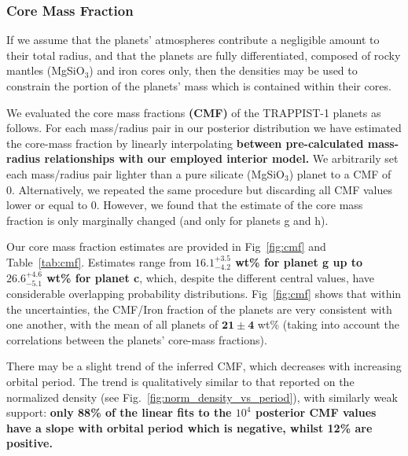 \documentclass[twocolumn]{aastex63}
\begin{document}
\subsubsection{Core Mass Fraction}
\label{sec:subsection_CMF}

If we assume that the planets' atmospheres contribute a negligible
amount to their total radius, and that the planets are fully differentiated, composed of rocky mantles (MgSiO$_3$) and iron cores only, then the densities may be used to constrain the portion of the planets' mass which is contained within their cores.

We evaluated the core mass fractions \textbf{(CMF)} of the TRAPPIST-1 planets as follows. For each mass/radius pair in our posterior distribution we have estimated the core-mass fraction by linearly interpolating \textbf{between pre-calculated mass-radius relationships with our employed interior model.} We arbitrarily set each mass/radius pair lighter than a pure silicate (MgSiO$_3$) planet to a CMF of 0. Alternatively, we repeated the same procedure but discarding all CMF values lower or equal to 0. However, we found that the estimate of the core mass fraction is only marginally changed (and only for planets g and h).

Our core mass fraction estimates are provided in Fig~\ref{fig:cmf} and Table~\ref{tab:cmf}.  Estimates range from \textbf{$\mathbf{16.1_{-4.2}^{+3.5}}$ wt\% for planet g up to $\mathbf{26.6_{-5.1}^{+4.6}}$ wt\% for planet c}, which,  despite the different central values, have considerable overlapping probability distributions.
Fig~\ref{fig:cmf} shows that within the uncertainties, the CMF/Iron fraction of the planets are very consistent with one another, with the mean of all planets of \textbf{$\mathbf{21{\pm}4}$} wt\% (taking into account the correlations between the planets' core-mass fractions).

There may be a slight trend of the inferred CMF, which decreases with increasing orbital period. The trend is qualitatively similar to that reported on the normalized density (see Fig.~\ref{fig:norm_density_vs_period}), with similarly weak support: \textbf{only 88\% of the linear fits to the $10^4$ posterior CMF values have a slope with orbital period which is negative, whilst 12\% are positive.}
\end{document}
